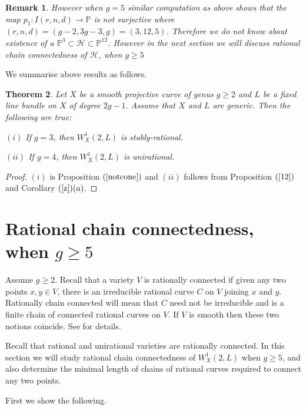 \documentclass[12pt, reqno]{amsart}
\newtheorem{theorem}{Theorem}[section]
\newtheorem{remark}[theorem]{Remark}
\begin{document}
\begin{remark}However when $g=5$ similar computation as above shows that the map $p_{1}:I(r,n,d)\rightarrow \mathbb{P}$ is not surjective where $(r,n,d)=(g-2,3g-3,g)=(3,12,5)$. Therefore we do not know about existence of a $\mathbb{P}^{3}\subset \mathcal{H} \subset \mathbb{P}^{12}$. However in the next section we will discuss rational chain connectedness of $\mathcal{H}$, when $g\geq 5$ 
\end{remark}

We summarise above results as follows.

\begin{theorem}\label{main}
    Let $X$ be a smooth projective curve of genus $g\geq 2$ and $L$ be a fixed line bundle on $X$ of degree $2g-1$. Assume that $X$ and $L$ are generic. Then the following are true:

    $(i)$ If $g=3$, then $W^{1}_{X}(2,L)$ is stably-rational.

    $(ii)$ If $g=4$, then $W^{1}_{X}(2,L)$ is unirational. 
\end{theorem}
\begin{proof}
   $(i)$ is Proposition $(\ref{notcone})$ and $(ii)$ follows from Proposition $(\ref{12})$ and Corollary $(\ref{z})(a)$. 
\end{proof} 

\section{Rational chain connectedness, when  $g\geq 5$}

Assume $g\geq 2$.
 Recall that a variety $V$ is rationally connected if given any two points $x,y \in V$, there is an irreducible  rational curve $C$ on $V$ joining $x$ and $y$. Rationally chain connected will mean that $C$ need not be irreducible and is a finite chain of connected rational curves on $V$. If $V$ is smooth then these two notions coincide. See \cite{Kollar} for details.

Recall that rational and unirational varieties are rationally connected. In this section we will study rational chain connectedness of $W^1_X(2,L)$ when $g\geq 5$, and also determine the minimal length of  chains of rational curves required to connect any two points. 

 First we show the following.
\end{document}
